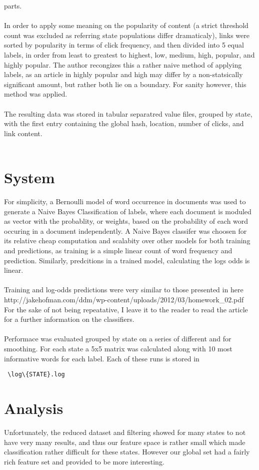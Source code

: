 \documentclass[11pt]{article}
\begin{document}
parts. \\
\\
In order to apply some meaning on the popularity of content (a strict threshold 
count was excluded as referring state populations differ dramaticaly), links 
were sorted by popularity in terms of click frequency, and then divided into 5
equal labels, in order from least to greatest to highest, low, medium, high, 
popular, and highly popular. The author recongizes this a rather 
naive method of applying labels, as an article in highly popular and high may 
differ by a non-statsically significant amount, but rather both lie on a 
boundary.  For sanity however, this method was applied.\\
\\
The resulting data was stored in tabular separatred value files, grouped by 
state, with the first entry containing the global hash, location, number of 
clicks, and link content.\\ 
\\

\section{System}
For simplicity, a Bernoulli model of word occurrence in documents was used to 
generate a Naive Bayes Classification of labels, where each document is moduled 
as vector with the probablity, or weights, based on the probability of each 
word occuring in a document independently.  A Naive Bayes classifer was choosen 
for its relative cheap computation and scalabity over other models for both 
training and predictions, as training is a simple linear count of word 
frequency and prediction. Similarly, predcitions in a trained model, calculating
the logs odds is linear.\\
\\
Training and log-odds predictions were very similar to those presented in here
http://jakehofman.com/ddm/wp-content/uploads/2012/03/homework_02.pdf
For the sake of not being repeatative, I leave it to the reader to read the 
article for a further information on the classifiers.\\
\\
Performace was evaluated grouped by state on a series of different \alpha and 
\beta for smoothing.  For each state a 5x5 matrix was calculated along with 
10 most informative words for each label. Each of these runs is stored in
\begin{verbatim} \log\{STATE}.log \end{verbatim} 
\section{Analysis}
Unfortunately, the reduced dataset and filtering showed for many states to not 
have very many results, and thus our feature space is rather small which made
classification rather difficult for these states.  However our global set 
had a fairly rich feature set and provided to be more interesting.
\end{document}
